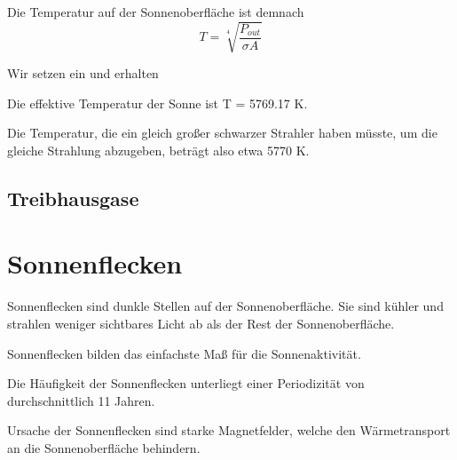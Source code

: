 \documentclass[
  a4paper,
  DIV=11]{scrreprt}
\newenvironment{Shaded}{\begin{snugshade}}{\end{snugshade}}
\newcommand{\ConstantTok}[1]{\textcolor[rgb]{0.56,0.35,0.01}{#1}}
\newcommand{\FloatTok}[1]{\textcolor[rgb]{0.68,0.00,0.00}{#1}}
\newcommand{\FunctionTok}[1]{\textcolor[rgb]{0.28,0.35,0.67}{#1}}
\newcommand{\NormalTok}[1]{\textcolor[rgb]{0.00,0.23,0.31}{#1}}
\newcommand{\OperatorTok}[1]{\textcolor[rgb]{0.37,0.37,0.37}{#1}}
\newcommand{\SpecialCharTok}[1]{\textcolor[rgb]{0.37,0.37,0.37}{#1}}
\newcommand{\StringTok}[1]{\textcolor[rgb]{0.13,0.47,0.30}{#1}}
\begin{document}
Die Temperatur auf der Sonnenoberfläche ist demnach \[
T = \sqrt[4]{\frac{P_{out}}{\sigma A}}
\]

Wir setzen ein und erhalten

\begin{Shaded}
\end{Shaded}

Die effektive Temperatur der Sonne ist T = 5769.17 K.

Die Temperatur, die ein gleich großer schwarzer Strahler haben müsste,
um die gleiche Strahlung abzugeben, beträgt also etwa 5770 K.

\hypertarget{treibhausgase}{%
\section{Treibhausgase}\label{treibhausgase}}

\hypertarget{sonnenflecken}{%
\chapter{Sonnenflecken}\label{sonnenflecken}}

Sonnenflecken sind dunkle Stellen auf der Sonnenoberfläche. Sie sind
kühler und strahlen weniger sichtbares Licht ab als der Rest der
Sonnenoberfläche.

Sonnenflecken bilden das einfachste Maß für die Sonnenaktivität.

Die Häufigkeit der Sonnenflecken unterliegt einer Periodizität von
durchschnittlich 11 Jahren.

Ursache der Sonnenflecken sind starke Magnetfelder, welche den
Wärmetransport an die Sonnenoberfläche behindern.
\end{document}
